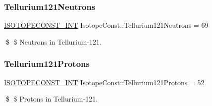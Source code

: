 \subsubsection{\texorpdfstring{Tellurium121\+Neutrons}{Tellurium121Neutrons}}
{\footnotesize\ttfamily \mbox{\hyperlink{group___isotope_const-_macros_ga5f18360b3e99483a35c32d789e62621c}{I\+S\+O\+T\+O\+P\+E\+C\+O\+N\+S\+T\+\_\+\+I\+NT}} Isotope\+Const\+::\+Tellurium121\+Neutrons = 69}

\$ \$ Neutrons in Tellurium-\/121. \mbox{\label{group___isotope_const-_tellurium-_te121_ga7be3a0b2db304c4277f45dd8f17bd517}} 
\subsubsection{\texorpdfstring{Tellurium121\+Protons}{Tellurium121Protons}}
{\footnotesize\ttfamily \mbox{\hyperlink{group___isotope_const-_macros_ga5f18360b3e99483a35c32d789e62621c}{I\+S\+O\+T\+O\+P\+E\+C\+O\+N\+S\+T\+\_\+\+I\+NT}} Isotope\+Const\+::\+Tellurium121\+Protons = 52}

\$ \$ Protons in Tellurium-\/121. 